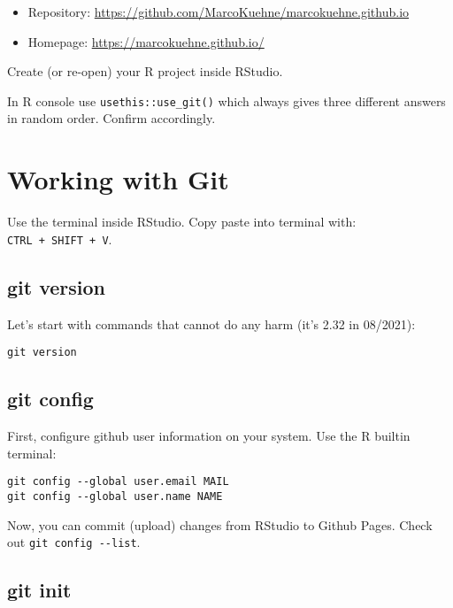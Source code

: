 \documentclass[
]{book}
\providecommand{\tightlist}{%
  \setlength{\itemsep}{0pt}\setlength{\parskip}{0pt}}
\begin{document}
\begin{itemize}
\tightlist
\item
  Repository: \url{https://github.com/MarcoKuehne/marcokuehne.github.io}
\item
  Homepage: \url{https://marcokuehne.github.io/}
\end{itemize}

Create (or re-open) your R project inside RStudio.

In R console use \texttt{usethis::use\_git()} which always gives three different answers in random order. Confirm accordingly.

\hypertarget{working-with-git}{%
\section{Working with Git}\label{working-with-git}}

Use the terminal inside RStudio. Copy paste into terminal with: \texttt{CTRL\ +\ SHIFT\ +\ V}.

\hypertarget{git-version}{%
\subsection{git version}\label{git-version}}

Let's start with commands that cannot do any harm (it's 2.32 in 08/2021):

\begin{verbatim}
git version
\end{verbatim}

\hypertarget{git-config}{%
\subsection{git config}\label{git-config}}

First, configure github user information on your system. Use the R builtin terminal:

\begin{verbatim}
git config --global user.email MAIL
git config --global user.name NAME
\end{verbatim}

Now, you can commit (upload) changes from RStudio to Github Pages. Check out \texttt{git\ config\ -\/-list}.

\hypertarget{git-init}{%
\subsection{git init}\label{git-init}}
\end{document}
